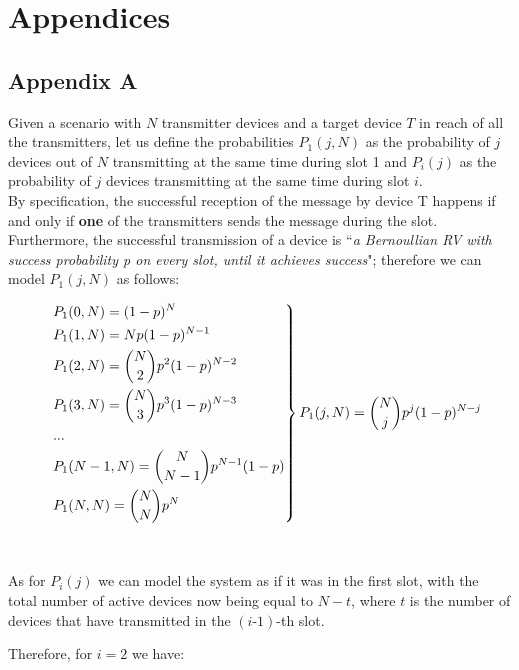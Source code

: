 %
\chapter{Appendices}

\section*{Appendix A}
Given a scenario with $N$ transmitter devices and a target device $T$ in reach of all the transmitters, let us define the probabilities $P_{1}(j, N)$ as the probability of $j$ devices out of $N$ transmitting at the same time during slot 1 and $P_{i}(j)$ as the probability of $j$ devices transmitting at the same time during slot $i$.\\
By specification, the successful reception of the message by device T happens if and only if \textbf{one} of the transmitters sends the message during the slot.
Furthermore, the successful transmission of a device is ``\textit{a Bernoullian RV with success probability \emph{p} on every slot, until it achieves success}"; therefore we can model $P_{1}(j, N)$ as 
follows:

\[
\begin{drcases}
    &P_{1}(0, N) = (1-p)^{N} \\
    &P_{1}(1, N) = N p(1-p)^{N-1}\\
    &P_{1}(2, N) = {N\choose2}p^{2}(1-p)^{N-2}\\
	&P_{1}(3, N) = {N\choose3}p^{3}(1-p)^{N-3}\\
	&...\\
	&P_{1}(N-1, N) = {N\choose N-1}p^{N-1}(1-p)\\
	&P_{1}(N, N) = {N\choose N}p^{N}\\
\end{drcases}
P_{1}(j, N) = {N\choose j} p^{j} (1-p)^{N-j}
\]
\\
\\
As for $P_{i}(j)$ we can model the system as if it was in the first slot, with the total number of active devices now being equal to $N-t$, where $t$ is the number of devices that have transmitted in the $(i\text{-}1)$-th slot.

Therefore, for $i=2$ we have:

